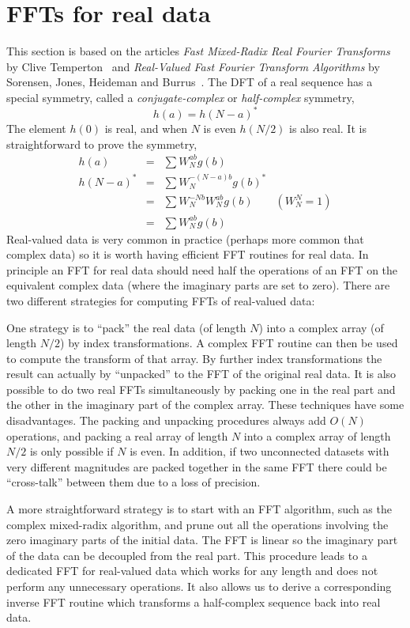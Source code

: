 \documentclass[fleqn,12pt]{article}
\begin{document}
\section{FFTs for real data}
%
This section is based on the articles {\em Fast Mixed-Radix Real
  Fourier Transforms} by Clive Temperton~\cite{temperton83real} and
{\em Real-Valued Fast Fourier Transform Algorithms} by Sorensen,
Jones, Heideman and Burrus~\cite{burrus87real}. The DFT of a real
sequence has a special symmetry, called a {\em conjugate-complex} or
{\em half-complex} symmetry,
%
\begin{equation}
h(a) = h(N-a)^*
\end{equation}
%
The element $h(0)$ is real, and when $N$ is even $h(N/2)$ is also
real. It is straightforward to prove the symmetry,
%
\begin{eqnarray}
h(a) &=& \sum W^{ab}_N g(b) \\
h(N-a)^* &=& \sum W^{-(N-a)b}_N g(b)^*  \\
         &=& \sum W^{-Nb}_N W^{ab}_N g(b) \qquad{(W^N_N=1)} \\
         &=& \sum W^{ab}_N g(b)
\end{eqnarray}
%
Real-valued data is very common in practice (perhaps more common that
complex data) so it is worth having efficient FFT routines for real
data. In principle an FFT for real data should need half the
operations of an FFT on the equivalent complex data (where the
imaginary parts are set to zero). There are two different strategies
for computing FFTs of real-valued data:

One strategy is to ``pack'' the real data (of length $N$) into a
complex array (of length $N/2$) by index transformations. A complex
FFT routine can then be used to compute the transform of that array.
By further index transformations the result can actually by
``unpacked'' to the FFT of the original real data. It is also possible
to do two real FFTs simultaneously by packing one in the real part and
the other in the imaginary part of the complex array.  These
techniques have some disadvantages. The packing and unpacking
procedures always add $O(N)$ operations, and packing a real array of
length $N$ into a complex array of length $N/2$ is only possible if
$N$ is even. In addition, if two unconnected datasets with very
different magnitudes are packed together in the same FFT there could
be ``cross-talk'' between them due to a loss of precision.

A more straightforward strategy is to start with an FFT algorithm,
such as the complex mixed-radix algorithm, and prune out all the
operations involving the zero imaginary parts of the initial data. The
FFT is linear so the imaginary part of the data can be decoupled from
the real part. This procedure leads to a dedicated FFT for real-valued
data which works for any length and does not perform any unnecessary
operations. It also allows us to derive a corresponding inverse FFT
routine which transforms a half-complex sequence back into real data.
\end{document}
